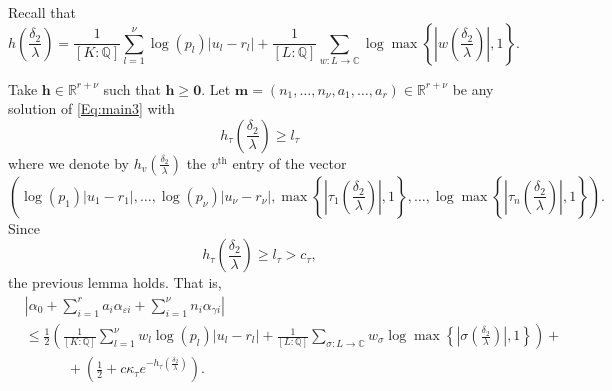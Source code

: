 Recall that
\[h\left(\frac{\delta_2}{\lambda}\right) =  \frac{1}{[K:\mathbb{Q}]}\sum_{l = 1}^{\nu} \log(p_l)|u_l - r_l| + \frac{1}{[L:\mathbb{Q}]}\sum_{w :L \to \mathbb{C}} \log \max \left\{ \left|w\left(\frac{\delta_2}{\lambda}\right)\right|, 1\right\}.\]

Take $\mathbf{h}\in\mathbb{R}^{r+\nu}$ such that $\mathbf{h}\geq \mathbf{0}$. Let $\mathbf{m} = (n_1, \dots, n_{\nu}, a_1, \dots, a_r) \in \mathbb{R}^{r + \nu}$ be any solution of \eqref{Eq:main3} with 
\[h_{\tau}\left(\frac{\delta_2}{\lambda}\right) \geq l_{\tau}\]
where we denote by $h_{v}\left(\frac{\delta_2}{\lambda}\right)$ the $v^{\text{th}}$ entry of the vector
\[\left(\log (p_1)|u_1 - r_1|, \dots, \log(p_{\nu})|u_{\nu} - r_{\nu}|, \max \left\{ \left|\tau_1\left(\frac{\delta_2}{\lambda}\right)\right|, 1\right\}, \dots, \log \max \left\{ \left|\tau_n\left(\frac{\delta_2}{\lambda}\right)\right|, 1\right\}\right).\] 
Since 
\[h_{\tau}\left(\frac{\delta_2}{\lambda}\right) \geq l_{\tau} > c_{\tau},\]
the previous lemma holds. That is, 
\begin{align*}
&\left|\alpha_0+\sum_{i = 1}^r a_i \alpha_{\varepsilon i} + \sum_{i = 1}^{\nu} n_i \alpha_{\gamma i}\right|\\
	& \leq \frac{1}{2}\left(\frac{1}{[K:\mathbb{Q}]}\sum_{l = 1}^{\nu}w_l \log(p_l)|u_l - r_l| + \frac{1}{[L:\mathbb{Q}]}\sum_{\sigma :L \to \mathbb{C}} w_{\sigma}\log \max \left\{ \left|\sigma\left(\frac{\delta_2}{\lambda}\right)\right|, 1\right\} \right) + \\
	& \quad \quad \quad + \left(\frac{1}{2} + c\kappa_{\tau}e^{-h_{\tau}\left(\frac{\delta_2}{\lambda}\right)}\right).
\end{align*} 


